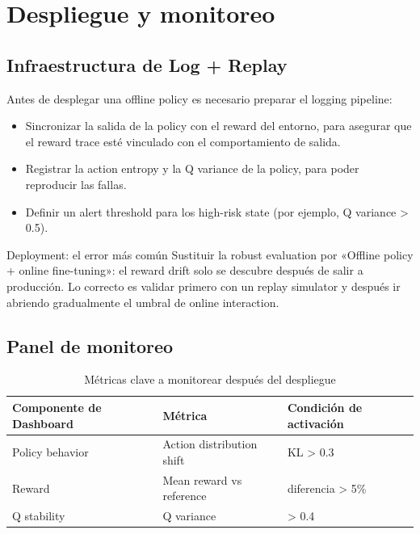 \section{Despliegue y monitoreo}

\subsection{Infraestructura de Log + Replay}

Antes de desplegar una offline policy es necesario preparar el logging pipeline:

\begin{itemize}
    \item Sincronizar la salida de la policy con el reward del entorno, para asegurar que el reward trace esté vinculado con el comportamiento de salida.
    \item Registrar la action entropy y la Q variance de la policy, para poder reproducir las fallas.
    \item Definir un alert threshold para los high-risk state (por ejemplo, Q variance > 0.5).
\end{itemize}

\begin{warningbox}{Deployment: el error más común}
Sustituir la robust evaluation por «Offline policy + online fine-tuning»: el reward drift solo se descubre después de salir a producción. Lo correcto es validar primero con un replay simulator y después ir abriendo gradualmente el umbral de online interaction.
\end{warningbox}

\subsection{Panel de monitoreo}

\begin{table}[H]
\centering
\begin{tabular}{p{} p{} p{}}
\toprule
Componente de Dashboard & Métrica & Condición de activación \\
\midrule
Policy behavior & Action distribution shift & KL > 0.3 \\
Reward & Mean reward vs reference & diferencia > 5\% \\
Q stability & Q variance & > 0.4 \\
\bottomrule
\end{tabular}
\caption{Métricas clave a monitorear después del despliegue}
\end{table}

